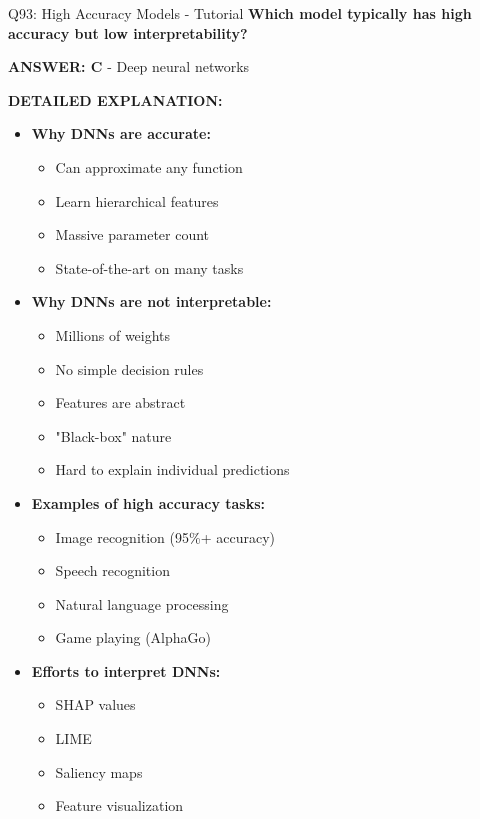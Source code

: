 \documentclass[8pt]{beamer}
\begin{document}
	\begin{frame}{Q93: High Accuracy Models - Tutorial}
		\fontsize{6.5}{7.5}\selectfont
		\textbf{Which model typically has high accuracy but low interpretability?}
		
		\vspace{0.05cm}
		\textcolor{myblue}{\textbf{ANSWER: C}} - Deep neural networks
		
		\vspace{0.05cm}
		\textbf{DETAILED EXPLANATION:}
		\begin{itemize}
			\item \textbf{Why DNNs are accurate:}
			\begin{itemize}
				\item Can approximate any function
				\item Learn hierarchical features
				\item Massive parameter count
				\item State-of-the-art on many tasks
			\end{itemize}
			\item \textbf{Why DNNs are not interpretable:}
			\begin{itemize}
				\item Millions of weights
				\item No simple decision rules
				\item Features are abstract
				\item "Black-box" nature
				\item Hard to explain individual predictions
			\end{itemize}
			\item \textbf{Examples of high accuracy tasks:}
			\begin{itemize}
				\item Image recognition (95\%+ accuracy)
				\item Speech recognition
				\item Natural language processing
				\item Game playing (AlphaGo)
			\end{itemize}
			\item \textbf{Efforts to interpret DNNs:}
			\begin{itemize}
				\item SHAP values
				\item LIME
				\item Saliency maps
				\item Feature visualization
			\end{itemize}
		\end{itemize}
		

\end{frame}
\end{document}
